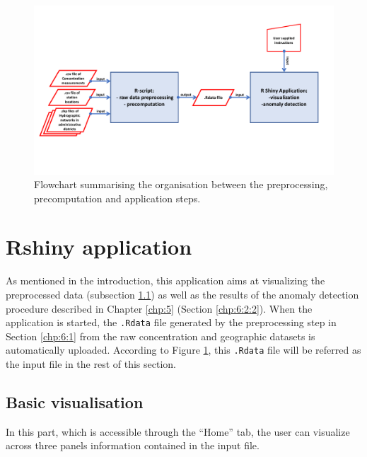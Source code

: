 \begin{figure}[htbp]
  \centering
  \includegraphics[angle = 90,scale = 0.65]{figs/Chap6/organigramme.pdf}
  \caption{Flowchart summarising the organisation between the preprocessing, precomputation and application steps.}
  \label{fig:orga}
\end{figure}

\section{Rshiny application}\label{chp:6:2}

As mentioned in the introduction, this application aims at visualizing the preprocessed data (subsection \ref{chp:6:2:1}) as well as the results of the anomaly detection procedure described in Chapter \ref{chp:5} (Section \ref{chp:6:2:2}). When the application is started, the \texttt{.Rdata} file generated by the preprocessing step in Section \ref{chp:6:1} from the raw concentration and geographic datasets is automatically uploaded. According to Figure \ref{fig:orga}, this \texttt{.Rdata} file will be referred as the input file in the rest of this section. 

\subsection{Basic visualisation}\label{chp:6:2:1}

  

In this part, which is accessible through the ``Home'' tab, the user can visualize across three panels information contained in the input file.

